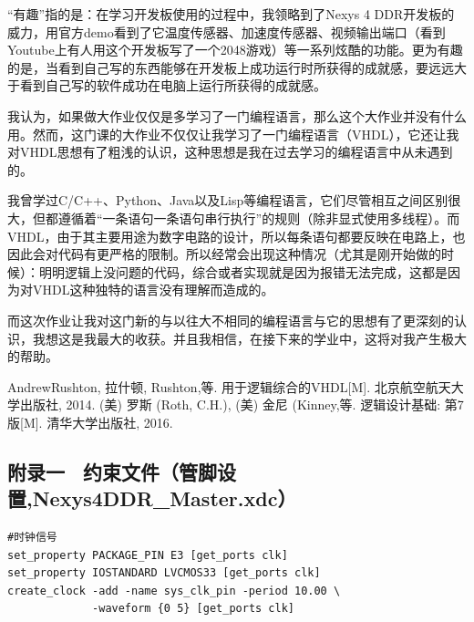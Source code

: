 \documentclass[11pt, a4paper]{article}
\begin{document}
\begin{CJK*}{UTF8}{gbsn}
  “有趣”指的是：在学习开发板使用的过程中，我领略到了Nexys 4 DDR开发板的威力，用官方demo看到了它温度传感器、加速度传感器、视频输出端口（看到Youtube上有人用这个开发板写了一个2048游戏）等一系列炫酷的功能。更为有趣的是，当看到自己写的东西能够在开发板上成功运行时所获得的成就感，要远远大于看到自己写的软件成功在电脑上运行所获得的成就感。

  我认为，如果做大作业仅仅是多学习了一门编程语言，那么这个大作业并没有什么用。然而，这门课的大作业不仅仅让我学习了一门编程语言（VHDL），它还让我对VHDL思想有了粗浅的认识，这种思想是我在过去学习的编程语言中从未遇到的。

  我曾学过C/C++、Python、Java以及Lisp等编程语言，它们尽管相互之间区别很大，但都遵循着“一条语句一条语句串行执行”的规则（除非显式使用多线程）。而VHDL，由于其主要用途为数字电路的设计，所以每条语句都要反映在电路上，也因此会对代码有更严格的限制。所以经常会出现这种情况（尤其是刚开始做的时候）：明明逻辑上没问题的代码，综合或者实现就是因为报错无法完成，这都是因为对VHDL这种独特的语言没有理解而造成的。

  而这次作业让我对这门新的与以往大不相同的编程语言与它的思想有了更深刻的认识，我想这是我最大的收获。并且我相信，在接下来的学业中，这将对我产生极大的帮助。

  \renewcommand\refname{参考文献}
  \begin{thebibliography}{99}
  AndrewRushton, 拉什顿, Rushton,等. 用于逻辑综合的VHDL[M]. 北京航空航天大学出版社, 2014.
  (美) 罗斯 (Roth, C.H.), (美) 金尼 (Kinney,等. 逻辑设计基础: 第7版[M]. 清华大学出版社, 2016.
  \end{thebibliography}
  
  
  
  \renewcommand\appendixname{附\ 录}
  \renewcommand\appendixpagename{附\ 录}
  \renewcommand{\appendixtocname}{附录}
  \renewcommand{\appendixpagename}{附录}

  \begin{appendices}
    \subsection*{附录一 \  约束文件（管脚设置,Nexys4DDR\_Master.xdc）}
  \begin{verbatim}
#时钟信号
set_property PACKAGE_PIN E3 [get_ports clk]
set_property IOSTANDARD LVCMOS33 [get_ports clk]
create_clock -add -name sys_clk_pin -period 10.00 \
             -waveform {0 5} [get_ports clk]


\end{verbatim}
\end{appendices}
\end{CJK*}
\end{document}
